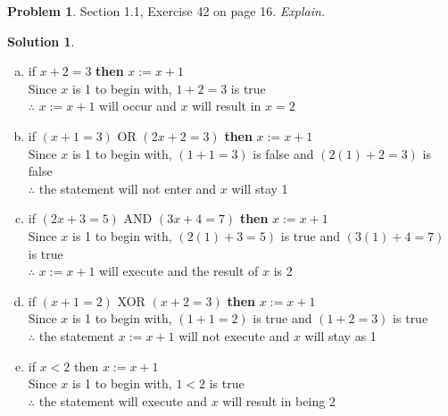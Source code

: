 \documentclass{article}
\theoremstyle{definition}
\newtheorem{problem}{Problem}
\newtheorem*{solution}{Solution}
\begin{document}
\begin{problem} Section 1.1, Exercise 42 on page 16. \textsl{Explain.}
\end{problem}
\begin{solution}
\begin{enumerate}[(a)] $x := 1$
  \item if $x + 2 = 3$ \textbf{then} $x := x + 1$ \\
  Since $x$ is 1 to begin with, $1 + 2 = 3$ is true \\
  $\therefore$ $x := x + 1$ will occur and $x$ will result in $x = 2$
  
  \item if $(x + 1 = 3)$ OR $(2x + 2 = 3)$ \textbf{then} $x := x + 1$ \\
  Since $x$ is 1 to begin with, $(1 + 1 = 3)$ is false and $(2(1) + 2 = 3)$ is false \\
  $\therefore$ the statement will not enter and $x$ will stay 1
  
  \item if $(2x + 3 = 5)$ AND $(3x + 4 = 7)$ \textbf{then} $x := x + 1$ \\
  Since $x$ is 1 to begin with, $(2(1) + 3 = 5)$ is true and $(3(1) + 4 = 7)$ is true \\
  $\therefore$ $x := x + 1$ will execute and the result of $x$ is 2  
  
  \item if $(x + 1 = 2)$ XOR $(x + 2 = 3)$ \textbf{then} $x := x + 1$ \\
  Since $x$ is 1 to begin with, $(1 + 1 = 2)$ is true and $(1 + 2 = 3)$ is true \\
  $\therefore$ the statement $x := x+1$ will not execute and $x$ will stay as 1
  
  \item if $x < 2$ then $x := x + 1$ \\
  Since $x$ is 1 to begin with, $1 < 2$ is true \\
  $\therefore$ the statement will execute and $x$ will result in being 2 \\
\end{enumerate}
\end{solution}
\end{document}
